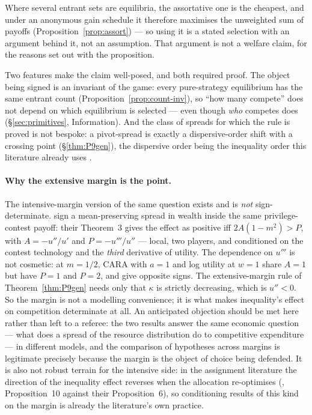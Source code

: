 \documentclass[11pt]{article}
\begin{document}
Where several entrant sets are equilibria, the assortative one is the
cheapest, and under an anonymous gain schedule it therefore maximises the
unweighted sum of payoffs (Proposition~\ref{prop:assort}) --- so using it is
a stated selection with an argument behind it, not an assumption. That
argument is not a welfare claim, for the reasons set out with the
proposition.

Two features make the claim well-posed, and both required proof. The object
being signed is an invariant of the game: every pure-strategy equilibrium has
the same entrant count (Proposition~\ref{prop:count-inv}), so ``how many
compete'' does not depend on which equilibrium is selected --- even though
\emph{who} competes does (\S\ref{sec:primitives}, Information). And the class
of spreads for which the rule is proved is not bespoke: a pivot-spread is
exactly a dispersive-order shift with a crossing point
(\S\ref{thm:P9gen}), the dispersive order being the inequality order this
literature already uses \citep{HopkinsKornienko2009,Shaked1982}.

\paragraph{Why the extensive margin is the point.} The intensive-margin
version of the same question exists and is \emph{not} sign-determinate.
\citet{SchroyenTreich2016} sign a mean-preserving spread in wealth inside the
same privilege-contest payoff: their Theorem~3 gives the effect as positive
iff $2A(1-m^2) > P$, with $A = -u''/u'$ and $P = -u'''/u''$ --- local, two
players, and conditioned on the contest technology and the \emph{third}
derivative of utility. The dependence on $u'''$ is not cosmetic: at $m=1/2$,
CARA with $a=1$ and log utility at $w=1$ share $A=1$ but have $P=1$ and
$P=2$, and give opposite signs. The extensive-margin rule of
Theorem~\ref{thm:P9gen} needs only that $\kappa$ is strictly decreasing,
which is $u''<0$. So the margin is not a modelling convenience; it is what
makes inequality's effect on competition determinate at all. An anticipated
objection should be met here rather than left to a referee: the two results
answer the same economic question --- what does a spread of the resource
distribution do to competitive expenditure --- in different models, and the
comparison of hypotheses across margins is legitimate precisely because the
margin is the object of choice being defended. It is also not robust
terrain for the intensive side: in the assignment literature the direction
of the inequality effect reverses when the allocation re-optimises
(\citet{CostrellLoury2004}, Proposition~10 against their Proposition~6), so
conditioning results of this kind on the margin is already the literature's
own practice.
\end{document}

